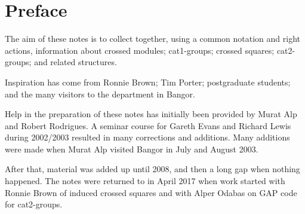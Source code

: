 
\section*{Preface}


The aim of these notes is to collect together, using a common notation
and right actions, information about crossed modules; cat1-groups;
crossed squares; cat2-groups; and related structures.

Inspiration has come from Ronnie Brown; Tim Porter; postgraduate students;
and the many visitors to the department in Bangor.

Help in the preparation of these notes has initially been 
provided by Murat Alp and Robert Rodrigues.
A seminar course for Gareth Evans and Richard Lewis during 2002/2003 
resulted in many corrections and additions.
Many additions were made when Murat Alp visited Bangor in July and August 2003.

After that, material was added up until 2008, 
and then a long gap when nothing happened. 
The notes were returned to in April 2017 when work started with Ronnie Brown 
of induced crossed squares and with Alper Odabas on GAP code for cat2-groups. 

